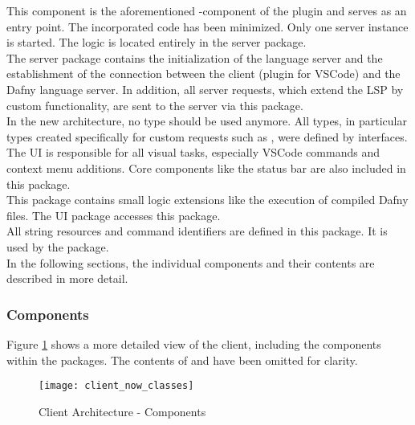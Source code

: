 {\bf {}} \textendash{}
This component is the aforementioned -component of the plugin and serves as an entry point.
The incorporated code has been minimized.
Only one server instance is started.
The logic is located entirely in the server package.\\

{\bf {}} \textendash{}
The server package contains the initialization of the language server and the establishment of the connection between the client (plugin for VSCode) and the Dafny language server.
In addition, all server requests, which extend the LSP by custom functionality, are sent to the server via this package.\\

{\bf {}} \textendash{}
In the new architecture, no  type should be used anymore.
All types, in particular types created specifically for custom requests such as , were defined by interfaces. \\

{\bf {}} \textendash{}
The UI is responsible for all visual tasks, especially VSCode commands and context menu additions.
Core components like the status bar are also included in this package.\\

{\bf {}} \textendash{}
This package contains small logic extensions like the execution of compiled Dafny files.
The UI package accesses this package.\\

{\bf {}} \textendash{}
All string resources and command identifiers are defined in this package.
It is used by the  package. \\

In the following sections, the individual components and their contents are described in more detail.

\subsubsection{Components}
Figure \ref{fig:client_now_classes} shows a more detailed view of the client, including the components within the packages.
The contents of  and  have been omitted for clarity.\\

\begin{figure}[H]
    \centering
    \texttt{[image: client\_now\_classes]}
    \caption{Client Architecture - Components}
    \label{fig:client_now_classes}
\end{figure}

